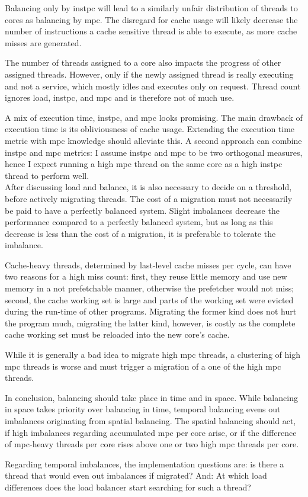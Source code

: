 Balancing only by \gls{instpc} will lead to a similarly unfair distribution of
threads to cores as balancing by \gls{mpc}.
The disregard for cache usage will likely decrease the number of instructions
a cache sensitive thread is able to execute, as more cache misses are
generated.

The number of threads assigned to a core also impacts the progress of other
assigned threads.
However, only if the newly assigned thread is really executing and not a service,
which mostly idles and executes only on request.
Thread count ignores load, \gls{instpc}, and \gls{mpc} and is therefore
not of much use.

A mix of execution time, \gls{instpc}, and \gls{mpc} looks promising.
The main drawback of execution time is its obliviousness of cache usage.
Extending the execution time metric with \gls{mpc} knowledge should alleviate this.
A second approach can combine \gls{instpc} and \gls{mpc} metrics: I assume
\gls{instpc} and \gls{mpc} to be two orthogonal measures, hence I expect running a
high \gls{mpc} thread on the same core as a high \gls{instpc} thread to perform
well.
\\


After discussing load and balance, it is also necessary to decide on a
threshold, before actively migrating threads.
The cost of a migration must not necessarily be paid to have a perfectly
balanced system.
Slight imbalances decrease the performance compared to a perfectly balanced
system, but as long as this decrease is less than the cost of a migration,
it is preferable to tolerate the imbalance.

Cache-heavy threads, determined by last-level cache misses per cycle, can have
two reasons for a high miss count: first, they reuse little memory and use new
memory in a not prefetchable manner, otherwise the prefetcher would not miss;
second, the cache working set is large and parts of the working set were
evicted during the run-time of other programs.
Migrating the former kind does not hurt the program much, migrating the latter
kind, however, is costly as the complete cache working set must be reloaded
into the new core's cache.

While it is generally a bad idea to migrate high \gls{mpc} threads, a
clustering of high \gls{mpc} threads is worse and must trigger a migration of a
one of the high \gls{mpc} threads.

In conclusion, balancing should take place in time and in space.
While balancing in space takes priority over balancing in time, temporal
balancing evens out imbalances originating from spatial balancing.
The spatial balancing should act, if high imbalances regarding accumulated
\gls{mpc} per core arise, or if the difference of \gls{mpc}-heavy threads per
core rises above one or two high \gls{mpc} threads per core.

Regarding temporal imbalances, the implementation questions are: is there a 
thread that would even out imbalances if migrated?
And: At which load differences does the load balancer start searching for such
a thread?
